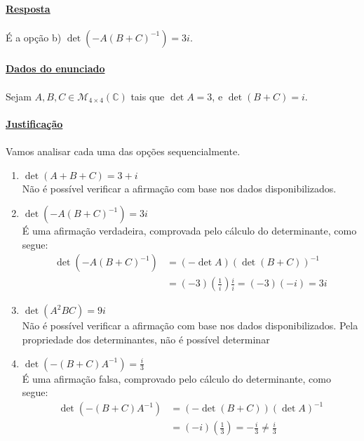 \exercicio{}

\paragraph{\underline{Resposta}}

\paragraph{} É a opção b) $\det(-A(B + C)^{-1}) = 3i$.

\paragraph{\underline{Dados do enunciado}}

\paragraph{}Sejam $A, B, C \in \mathcal{M}_{4 \times 4}(\mathbb{C})$ tais que
$\det A = 3$, e $\det(B + C) = i$.

\paragraph{\underline{Justificação}}


\paragraph{}Vamos analisar cada uma das opções sequencialmente.

\begin{enumerate}[label=\bfseries\alph*)]
	\item $\det(A + B + C) = 3 + i$\\
		Não é possível verificar a afirmação com base nos dados
		disponibilizados.
	\item $\det(-A(B+C)^{-1}) = 3i$\\
		É uma afirmação verdadeira, comprovada pelo cálculo do determinante,
		como segue:
		\begin{align*}
			\det(-A(B+C)^{-1})
			&= (-\det A)(\det(B+C))^{-1}\\
			&= (-3)\left(\frac{1}{i}\right) \frac{i}{i}
			= (-3)(-i)
			= 3i
		\end{align*}
	\item $\det(A^2 B C) = 9i$\\
		Não é possível verificar a afirmação com base nos dados
		disponibilizados. Pela propriedade dos determinantes, não é possível
		determinar 
	\item $\det(-(B+C)A^{-1}) = \frac{i}{3}$\\
		É uma afirmação falsa, comprovado pelo cálculo do determinante,
		como segue:
		\begin{align*}
			\det(-(B+C)A^{-1})
			&= (-\det(B+C))(\det A)^{-1}\\
			&= (-i)\left(\frac{1}{3}\right) = - \frac{i}{3}
			\neq \frac{i}{3}
		\end{align*}
\end{enumerate}
